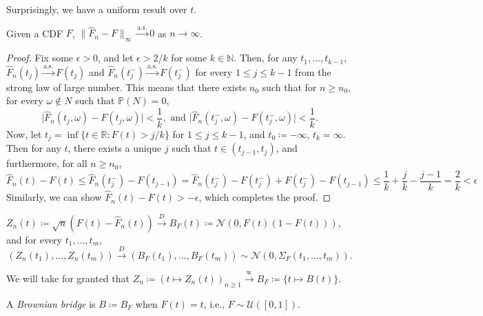 Surprisingly, we have a uniform result over \(t\).

\begin{theorem}\label{thm:Glivenko-Cantelli}
	Given a CDF \(F\), \(\lVert \hat{F} _n - F \rVert _\infty \overset{\text{a.s.} }{\to} 0\) as \(n \to \infty \).
\end{theorem}
\begin{proof}
	Fix some \(\epsilon > 0\), and let \(\epsilon > 2 / k\) for some \(k \in \mathbb{N} \). Then, for any \(t_1, \dots , t_{k-1}\), \(\hat{F} _n (t_j) \overset{\text{a.s.} }{\to } F(t_j)\) and \(\hat{F} _n(t_j^-) \overset{\text{a.s.} }{\to} F(t_j^-)\) for every \(1 \leq j \leq k-1\) from the strong law of large number. This means that there exists \(n_0\) such that for \(n \geq n_0\), for every \(\omega \notin N\) such that \(\mathbb{P} (N) = 0\),
	\[
		\vert \hat{F} _n(t_j, \omega ) - F(t_j, \omega ) \vert < \frac{1}{k} ,\text{ and }
		\vert \hat{F} _n(t_j^-, \omega ) - F(t_j^-, \omega ) \vert < \frac{1}{k}.
	\]
	Now, let \(t_j = \inf \{ t \in \mathbb{R} \colon F(t) > j / k \}\) for \(1 \leq j \leq k-1\), and \(t_0 \coloneqq -\infty \), \(t_k = \infty \). Then for any \(t\), there exists a unique \(j\) such that \(t \in (t_{j-1}, t_j)\), and furthermore, for all \(n \geq n_0\),
	\[
		\hat{F} _n(t) - F(t)
		\leq \hat{F} _n(t_j^-) - F(t_{j-1})
		= \hat{F} _n(t_j^-) - F(t_j^-) + F(t_j^-) - F(t_{j-1})
		\leq \frac{1}{k} + \frac{j}{k} - \frac{j-1}{k}
		= \frac{2}{k}
		< \epsilon
	\]
	Similarly, we can show \(\hat{F} _n(t) - F(t) > - \epsilon \), which completes the proof.
\end{proof}

\begin{prev}
	\(Z_n(t) \coloneqq \sqrt{n} (F(t) - \hat{F} _n(t)) \overset{D}{\to} B_F(t) \coloneqq \mathcal{N} (0, F(t) (1 - F(t)))\), and for every \(t_1, \dots , t_m\),
	\[
		(Z_n(t_1), \dots , Z_n(t_m)) \overset{D}{\to} (B_F(t_1), \dots , B_F(t_m)) \sim \mathcal{N} (0, \Sigma _F(t_1, \dots , t_m)).
	\]
\end{prev}

We will take for granted that \(Z_n \coloneqq (t \mapsto Z_n(t))_{n \geq 1} \overset{\text{w} }{\to} B_F \coloneqq \{ t \mapsto B(t) \} \).

\begin{definition}\label{def:Brownian-bridge}
	A \emph{Brownian bridge} is \(B \coloneqq B_F\) when \(F(t) = t\), i.e., \(F \sim \mathcal{U} ([0, 1])\).
\end{definition}

